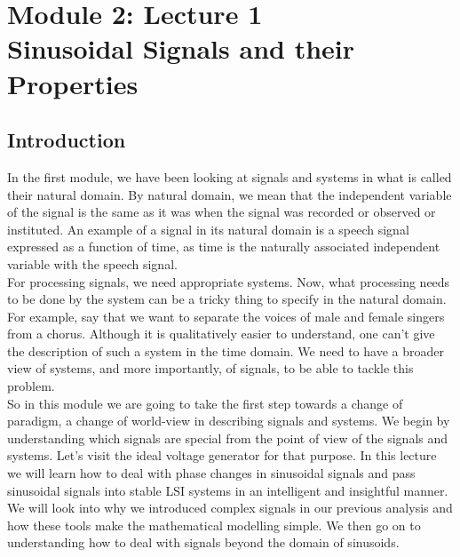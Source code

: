 \section{Module 2: Lecture 1\\Sinusoidal Signals and their Properties}

\subsection*{Introduction}
In the first module, we have been looking at signals and systems in what is
called their natural domain. By natural domain, we mean that the independent
variable of the signal is the same as it was when the signal was
recorded or observed or instituted. An example of a signal in its natural
domain is a speech signal expressed as a function of time, as time is the
naturally associated independent variable with the speech signal. \\
For processing signals, we need appropriate systems. Now, what processing needs to be done by the system can be a tricky thing to specify in the
natural domain. \\
For example, say that we want to separate the voices of male and female
singers from a chorus. Although it is qualitatively easier to understand, one can't give the description of such a system in the
time domain. We need to
have a broader view of systems, and more importantly, of signals, to be able
to tackle this problem. \\
So in this module we are going to take the first step towards a change of
paradigm, a change of world-view in describing signals and systems.
We begin by understanding which signals are special from the point of view of
the signals and systems. Let's visit the ideal voltage generator for that
purpose.
In this lecture we will learn how to deal with phase changes in sinusoidal signals and pass sinusoidal signals into stable LSI systems in an intelligent and insightful manner. We will look into why we introduced complex signals in our previous analysis and how these tools make the mathematical modelling simple. We then go on to understanding how to deal with signals beyond the domain of sinusoids.
